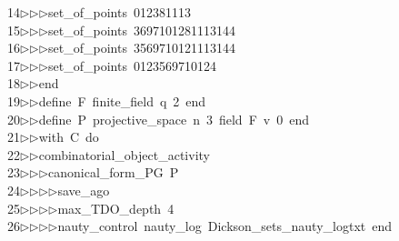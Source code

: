 \begin{tabbing}
14\>$\triangleright$\>$\triangleright$\>$\triangleright$\>set\_of\_points\ 012381113\ \\[0pt]
15\>$\triangleright$\>$\triangleright$\>$\triangleright$\>set\_of\_points\ 3697101281113144\ \\[0pt]
16\>$\triangleright$\>$\triangleright$\>$\triangleright$\>set\_of\_points\ 3569710121113144\ \\[0pt]
17\>$\triangleright$\>$\triangleright$\>$\triangleright$\>set\_of\_points\ 0123569710124\ \\[0pt]
18\>$\triangleright$\>$\triangleright$\>end\ \\[0pt]
19\>$\triangleright$\>$\triangleright$\>define\ F\ finite\_field\ q\ 2\ end\ \\[0pt]
20\>$\triangleright$\>$\triangleright$\>define\ P\ projective\_space\ n\ 3\ field\ F\ v\ 0\ end\ \\[0pt]
21\>$\triangleright$\>$\triangleright$\>with\ C\ do\ \\[0pt]
22\>$\triangleright$\>$\triangleright$\>combinatorial\_object\_activity\ \\[0pt]
23\>$\triangleright$\>$\triangleright$\>$\triangleright$\>canonical\_form\_PG\ P\ \\[0pt]
24\>$\triangleright$\>$\triangleright$\>$\triangleright$\>$\triangleright$\>save\_ago\ \\[0pt]
25\>$\triangleright$\>$\triangleright$\>$\triangleright$\>$\triangleright$\>max\_TDO\_depth\ 4\ \\[0pt]
26\>$\triangleright$\>$\triangleright$\>$\triangleright$\>$\triangleright$\>nauty\_control\ nauty\_log\ Dickson\_sets\_nauty\_logtxt\ end\ \\[0pt]

\end{tabbing}
